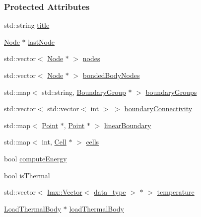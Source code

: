 \subsubsection*{Protected Attributes}
\begin{DoxyCompactItemize}
\item 
std\+::string \hyperlink{classmknix_1_1_body_a3c05cdff2d5f2b150046cd734d0ed7ce}{title}
\item 
\hyperlink{classmknix_1_1_node}{Node} $\ast$ \hyperlink{classmknix_1_1_body_a55bd3106cf4c12c8b4644e48b412f3c9}{last\+Node}
\item 
std\+::vector$<$ \hyperlink{classmknix_1_1_node}{Node} $\ast$ $>$ \hyperlink{classmknix_1_1_body_acbfce7ce37d4e7f616850da2a5850280}{nodes}
\item 
std\+::vector$<$ \hyperlink{classmknix_1_1_node}{Node} $\ast$ $>$ \hyperlink{classmknix_1_1_body_a4c8d492ccd9472119b5f8b47392c1dcd}{bonded\+Body\+Nodes}
\item 
std\+::map$<$ std\+::string, \hyperlink{classmknix_1_1_boundary_group}{Boundary\+Group} $\ast$ $>$ \hyperlink{classmknix_1_1_body_a36b757c3483aa0a65c064e2be0919bb0}{boundary\+Groups}
\item 
std\+::vector$<$ std\+::vector$<$ int $>$ $>$ \hyperlink{classmknix_1_1_body_a49d2061c709f04eacd6bc1ad2abe8e92}{boundary\+Connectivity}
\item 
std\+::map$<$ \hyperlink{classmknix_1_1_point}{Point} $\ast$, \hyperlink{classmknix_1_1_point}{Point} $\ast$ $>$ \hyperlink{classmknix_1_1_body_afd47959808ee823dff7457a535153ea0}{linear\+Boundary}
\item 
std\+::map$<$ int, \hyperlink{classmknix_1_1_cell}{Cell} $\ast$ $>$ \hyperlink{classmknix_1_1_body_ae42afe33182ecd4ab758fd252e079221}{cells}
\item 
bool \hyperlink{classmknix_1_1_body_a64fa35111fa3252c60971811dec421de}{compute\+Energy}
\item 
bool \hyperlink{classmknix_1_1_body_a2b8de3291a8b2678b1c989f4d6c52b89}{is\+Thermal}
\item 
std\+::vector$<$ \hyperlink{classlmx_1_1_vector}{lmx\+::\+Vector}$<$ \hyperlink{namespacemknix_a16be4b246fbf2cceb141e3a179111020}{data\+\_\+type} $>$ $\ast$ $>$ \hyperlink{classmknix_1_1_body_a29e955d93a12919d2adfec07a0f2f566}{temperature}
\item 
\hyperlink{classmknix_1_1_load_thermal_body}{Load\+Thermal\+Body} $\ast$ \hyperlink{classmknix_1_1_body_aef21ef0ead5775597ca38a9304a26682}{load\+Thermal\+Body}
\end{DoxyCompactItemize}


